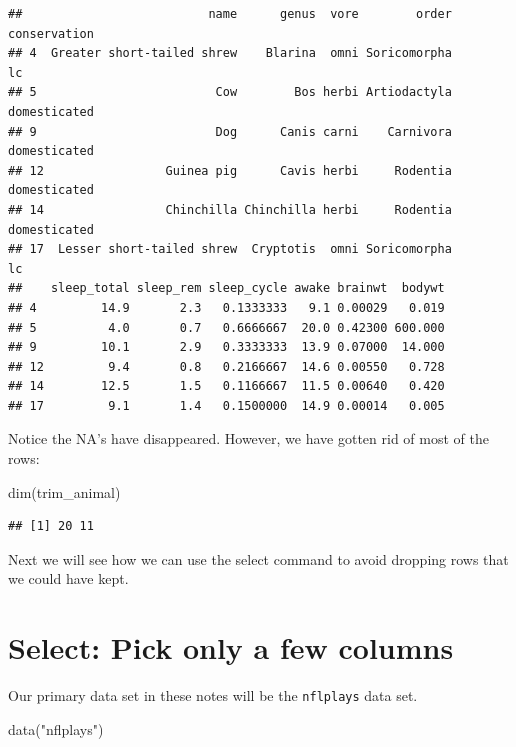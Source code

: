 \documentclass[
]{book}
\newenvironment{Shaded}{\begin{snugshade}}{\end{snugshade}}
\newcommand{\FunctionTok}[1]{\textcolor[rgb]{0.00,0.00,0.00}{#1}}
\newcommand{\NormalTok}[1]{#1}
\newcommand{\StringTok}[1]{\textcolor[rgb]{0.31,0.60,0.02}{#1}}
\theoremstyle{definition}
\theoremstyle{definition}
\theoremstyle{definition}
\theoremstyle{definition}
\theoremstyle{remark}
\begin{document}
\begin{verbatim}
##                          name      genus  vore        order conservation
## 4  Greater short-tailed shrew    Blarina  omni Soricomorpha           lc
## 5                         Cow        Bos herbi Artiodactyla domesticated
## 9                         Dog      Canis carni    Carnivora domesticated
## 12                 Guinea pig      Cavis herbi     Rodentia domesticated
## 14                 Chinchilla Chinchilla herbi     Rodentia domesticated
## 17  Lesser short-tailed shrew  Cryptotis  omni Soricomorpha           lc
##    sleep_total sleep_rem sleep_cycle awake brainwt  bodywt
## 4         14.9       2.3   0.1333333   9.1 0.00029   0.019
## 5          4.0       0.7   0.6666667  20.0 0.42300 600.000
## 9         10.1       2.9   0.3333333  13.9 0.07000  14.000
## 12         9.4       0.8   0.2166667  14.6 0.00550   0.728
## 14        12.5       1.5   0.1166667  11.5 0.00640   0.420
## 17         9.1       1.4   0.1500000  14.9 0.00014   0.005
\end{verbatim}

Notice the NA's have disappeared. However, we have gotten rid of most of the rows:

\begin{Shaded}
\begin{Highlighting}[]
\FunctionTok{dim}\NormalTok{(trim\_animal)}
\end{Highlighting}
\end{Shaded}

\begin{verbatim}
## [1] 20 11
\end{verbatim}

Next we will see how we can use the select command to avoid dropping rows that we could have kept.

\hypertarget{select-pick-only-a-few-columns}{%
\section{Select: Pick only a few columns}\label{select-pick-only-a-few-columns}}

Our primary data set in these notes will be the \texttt{nflplays} data set.

\begin{Shaded}
\begin{Highlighting}[]
\FunctionTok{data}\NormalTok{(}\StringTok{"nflplays"}\NormalTok{)}
\end{Highlighting}
\end{Shaded}
\end{document}
